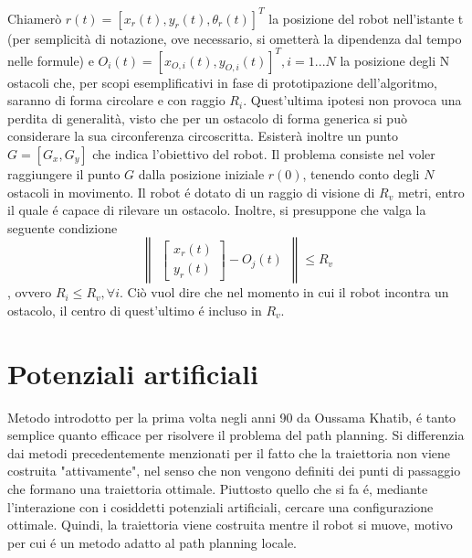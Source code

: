 \documentclass[14pt,a4paper]{extarticle}
\begin{document}
Chiamerò \( r(t) = [x_r(t),y_r(t),\theta_r(t)]^T\) la posizione del robot nell'istante t (per semplicità di notazione, ove necessario, si ometterà la dipendenza dal tempo nelle formule) e \( O_i(t) = [x_{O,i}(t),y_{O,i}(t)]^T, i = 1...N\) la posizione degli N ostacoli che, per scopi esemplificativi in fase di prototipazione dell'algoritmo, saranno di forma circolare e con raggio \(R_i\). Quest'ultima ipotesi non provoca una perdita di generalità, visto che per un ostacolo di forma generica si può considerare la sua circonferenza circoscritta. Esisterà inoltre un punto \(G = [G_x, G_y]\) che indica l'obiettivo del robot. Il problema consiste nel voler raggiungere il punto \(G\) dalla posizione iniziale \(r(0)\), tenendo conto degli \(N\) ostacoli in movimento. Il robot é dotato di un raggio di visione di \(R_v\) metri, entro il quale é capace di rilevare un ostacolo. Inoltre, si presuppone che valga la seguente condizione
\[\begin{Vmatrix}\begin{bmatrix} x_r(t)\\ y_r(t) \end{bmatrix} - O_j(t)\end{Vmatrix} \leq R_v \], ovvero \( R_i \leq R_v, \forall i\). Ciò vuol dire che nel momento in cui il robot incontra un ostacolo, il centro di quest'ultimo é incluso in \(R_v\). \newpage

\section{Potenziali artificiali}

Metodo introdotto per la prima volta negli anni 90 da Oussama Khatib, é tanto semplice quanto efficace per risolvere il problema del path planning. Si differenzia dai metodi precedentemente menzionati per il fatto che la traiettoria non viene costruita "attivamente", nel senso che non vengono definiti dei punti di passaggio che formano una traiettoria ottimale. Piuttosto quello che si fa é, mediante l'interazione con i cosiddetti potenziali artificiali, cercare una configurazione ottimale. Quindi, la traiettoria viene costruita mentre il robot si muove, motivo per cui é un metodo adatto al path planning locale.
\end{document}
